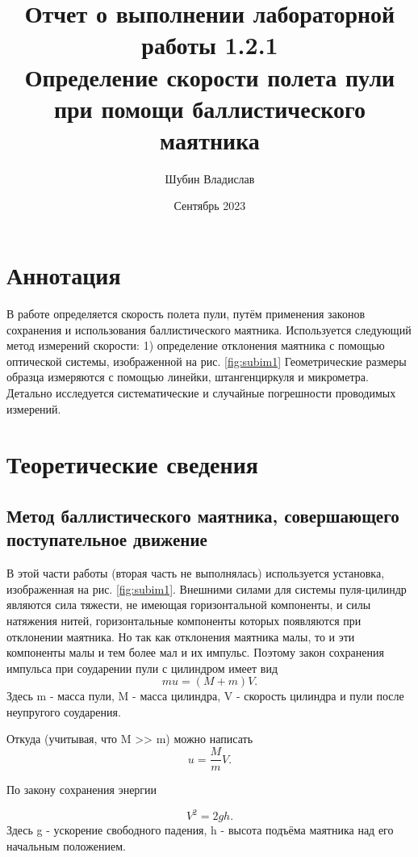 \documentclass[
	a4paper, %
	12pt, %
]{article}
\title{Отчет о выполнении лабораторной работы 1.2.1\\Определение скорости полета пули при помощи баллистического маятника}
\author{Шубин Владислав}
\date{Сентябрь 2023}
\begin{document}
    
	
	\maketitle
	
	\section{Аннотация}
	В работе определяется скорость полета пули, путём применения законов сохранения и использования баллистического маятника. Используется следующий метод измерений скорости: 1) определение отклонения маятника с помощью оптической системы, изображенной на рис. \ref{fig:subim1} Геометрические размеры образца измеряются с помощью линейки, штангенциркуля и микрометра. Детально исследуется систематические и случайные погрешности проводимых измерений.
	
	
	\section{Теоретические сведения}
	
	\subsection{Метод баллистического маятника, совершающего поступательное движение}
	
	В этой части работы (вторая часть не выполнялась) используется установка, изображенная на рис. \ref{fig:subim1}. Внешними силами для системы пуля-цилиндр являются сила тяжести, не имеющая горизонтальной компоненты, и силы натяжения нитей, горизонтальные компоненты которых появляются при отклонении маятника. Но так как отклонения маятника малы, то и эти компоненты малы и тем более мал и их импульс. Поэтому закон сохранения импульса при соударении пули с цилиндром имеет вид
	\begin{equation}
		mu = (M + m)V.
	\end{equation}
	Здесь m - масса пули, M - масса цилиндра, V - скорость цилиндра и пули после неупругого соударения.
	
	Откуда (учитывая, что M >> m) можно написать
	\begin{equation}
		u = \frac{M}{m}V.
	\end{equation}
	
	По закону сохранения энергии
	
	\begin{equation}
		V^2 = 2gh.
	\end{equation}
	Здесь g - ускорение свободного падения, h - высота подъёма маятника над его начальным положением.
	
\end{document}
